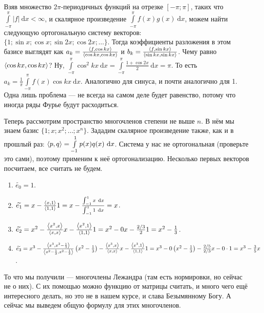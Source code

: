 \documentclass{article}
\begin{document}
\begin{itemize}
\begin{Example}
            Взяв множество $2\pi$-периодичных функций на отрезке $[-\pi;\pi]$, таких что $\int\limits_{-\pi}^\pi|f|~\mathrm dx<\infty$, и скалярное произведение $\int\limits_{-\pi}^\pi f(x)g(x)~\mathrm dx$, можем найти следующую ортогональную систему векторов:\\
            $\{1;\sin x;\cos x;\sin 2x;\cos 2x;\ldots\}$. Тогда коэффициенты разложения в этом базисе выглядят как $a_k=\frac{{\left\langle{f},{\cos kx}\right\rangle}}{{\left\langle{\cos kx},{\cos kx}\right\rangle}}$ и $b_k=\frac{{\left\langle{f},{\sin kx}\right\rangle}}{{\left\langle{\sin kx},{\sin kx}\right\rangle}}$. Чему равно ${\left\langle{\cos kx},{\cos kx}\right\rangle}$? Ну, $\int\limits_{-\pi}^\pi\cos^2kx~\mathrm dx=\int\limits_{-\pi}^\pi\frac{1+\cos 2x}2~\mathrm dx=\pi$. То есть $a_k=\frac1\pi\int\limits_{-\pi}^\pi f(x)\cos kx~\mathrm dx$. Аналогично для синуса, и почти аналогично для 1. Одна лишь проблема --- не всегда на самом деле будет равенство, потому что иногда ряды Фурье будут расходиться. 
        \end{Example}
        \begin{Example}
            Теперь рассмотрим пространство многочленов степени не выше $n$. В нём мы знаем базис $\{1;x;x^2;\ldots;x^n\}$. Зададим скалярное произведение также, как и в прошлый раз: ${\left\langle{p},{q}\right\rangle}=\int\limits_{-1}^1p(x)q(x)~\mathrm dx$. Система у нас не ортогональная (проверьте это сами), поэтому применим к неё ортогонализацию. Несколько первых векторов посчитаем, все считать не будем.
            \begin{enumerate}
                \item $\widetilde{e_0}=1$.
                \item $\widetilde{e_1}=x-\frac{{\left\langle{x},{1}\right\rangle}}{{\left\langle{1},{1}\right\rangle}}1=x-\frac{\int_{-1}^1x~\mathrm dx}{\int_{-1}^11~\mathrm dx}=x$.
                \item $\widetilde{e_2}=x^2-\frac{{\left\langle{x^2},{x}\right\rangle}}{{\left\langle{x},{x}\right\rangle}}x-\frac{{\left\langle{x^2},{1}\right\rangle}}{{\left\langle{1},{1}\right\rangle}}1=x^2-0x-\frac{2/3}21=x^2-\frac13$.
                \item $\widetilde{e_3}=x^3-\frac{{\left\langle{x^3},{x^2-\frac13}\right\rangle}}{{\left\langle{x^2-\frac13},{x^2-\frac13}\right\rangle}}\left(x^2-\frac13\right)-\frac{{\left\langle{x^3},{x}\right\rangle}}{{\left\langle{x},{x}\right\rangle}}x-\frac{{\left\langle{x^3},{1}\right\rangle}}{{\left\langle{1},{1}\right\rangle}}1=x^3-0\left(x^2-\frac13\right)-\frac{2/5}{2/3}x-0\cdot1=x^3-\frac35x$.
            \end{enumerate}
            То что мы получили --- многочлены Лежандра (там есть нормировки, но сейчас не о них). С их помощью можно функцию от матрицы считать, и много чего ещё интересного делать, но это не в нашем курсе, и слава Безымянному Богу. А сейчас мы выведем общую формулу для этих многочленов.

\end{Example}
\end{itemize}
\end{document}
